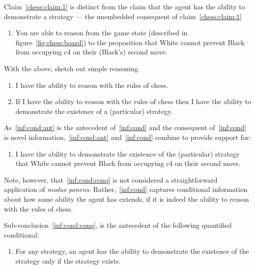 \begin{note}
  Claim~\ref{chess:claim:1} is distinct from the claim that the agent has the ability to demonstrate a strategy --- the unembedded consequent of claim~\ref{chess:claim:1}
\begin{enumerate}
\item\label{chess:claim:2}\label{chess:claim:1:unconditional} You are able to reason from the game state (described in figure~\ref{fig:chess:board}) to the proposition that White cannot prevent Black from occupying c4 on their (Black's) second move.
\end{enumerate}
\end{note}

\begin{note}
  With the above, sketch out simple reasoning.
  \begin{enumerate}[label=(S\arabic*), ref=(S\arabic*)]
  \item\label{inf:cond:ant} I have the ability to reason with the rules of chess.
  \item\label{inf:cond} If I have the ability to reason with the rules of chess then I have the ability to demonstrate the existence of a (particular) strategy.
  \end{enumerate}

  As~\ref{inf:cond:ant} is the antecedent of~\ref{inf:cond} and the consequent of~\ref{inf:cond} is novel information,~\ref{inf:cond:ant} and~\ref{inf:cond} combine to provide support for:

  \begin{enumerate}[resume, label=(S\arabic*), ref=(S\arabic*)]
  \item\label{inf:cond:conq} I have the ability to demonstrate the existence of the (particular) strategy that White cannot prevent Black from occupying c4 on their second move.
  \end{enumerate}

  Note, however, that~\ref{inf:cond:conq} is not considered a straightforward application of \emph{modus ponens}.
  Rather,~\ref{inf:cond} captures conditional information about how some ability the agent has extends, if it is indeed the ability to reason with the rules of chess.

  Sub-conclusion~\ref{inf:cond:conq}, is the antecedent of the following quantified conditional:

  \begin{enumerate}[resume, label=(S\arabic*), ref=(S\arabic*)]
  \item\label{inf:gae} For any strategy, an agent has the ability to demonstrate the existence of the strategy only if the strategy exists.
  \end{enumerate}


\end{note}
